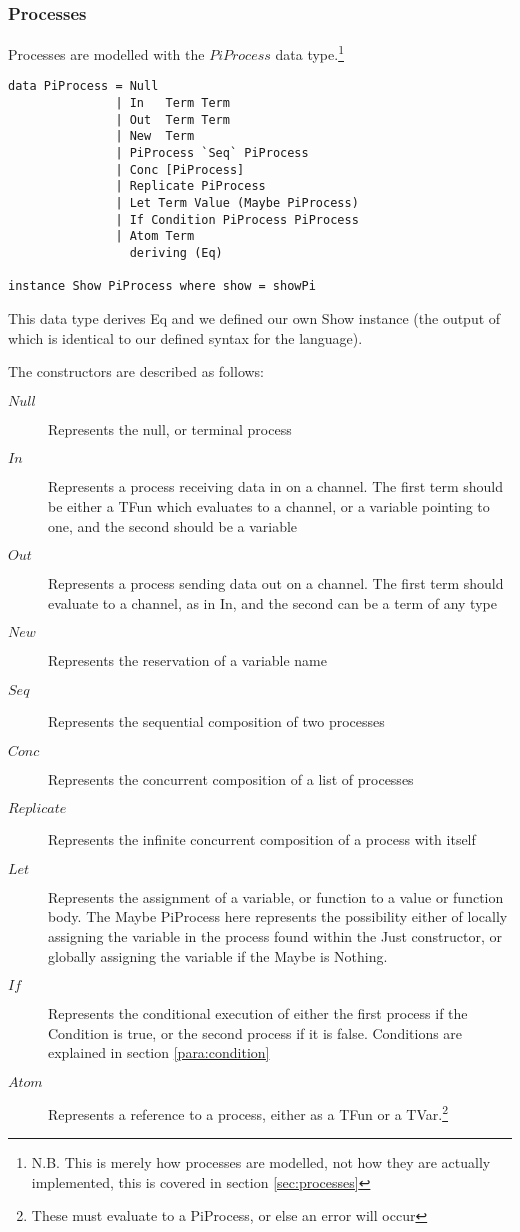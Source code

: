 \subsubsection{Processes}

Processes are modelled with the $PiProcess$ data type.\footnote{N.B. This is merely how processes are modelled, not how they are actually implemented, this is covered in section \ref{sec:processes}}

\begin{verbatim}
data PiProcess = Null
               | In   Term Term
               | Out  Term Term
               | New  Term
               | PiProcess `Seq` PiProcess 
               | Conc [PiProcess]          
               | Replicate PiProcess       
               | Let Term Value (Maybe PiProcess)
               | If Condition PiProcess PiProcess
               | Atom Term
                 deriving (Eq)

instance Show PiProcess where show = showPi
\end{verbatim}
This data type derives Eq and we defined our own Show instance (the output of which is identical to our defined syntax for the language). 

The constructors are described as follows:

\begin{description}
    \item[$Null$] Represents the null, or terminal process
    \item[$In$] Represents a process receiving data in on a channel. The first term should be either a TFun which evaluates to a channel, or a variable pointing to one, and the second should be a variable
    \item[$Out$] Represents a process sending data out on a channel. The first term should evaluate to a channel, as in In, and the second can be a term of any type
    \item[$New$] Represents the reservation of a variable name 
    \item[$Seq$] Represents the sequential composition of two processes
    \item[$Conc$] Represents the concurrent composition of a list of processes
    \item[$Replicate$] Represents the infinite concurrent composition of a process with itself
    \item[$Let$] Represents the assignment of a variable, or function to a value or function body. The Maybe PiProcess here represents the possibility either of locally assigning the variable in the process found within the Just constructor, or globally assigning the variable if the Maybe is Nothing.
    \item[$If$] Represents the conditional execution of either the first process if the Condition is true, or the second process if it is false. Conditions are explained in section \ref{para:condition}
    \item[$Atom$] Represents a reference to a process, either as a TFun or a TVar.\footnote{These must evaluate to a PiProcess, or else an error will occur}
\end{description}

